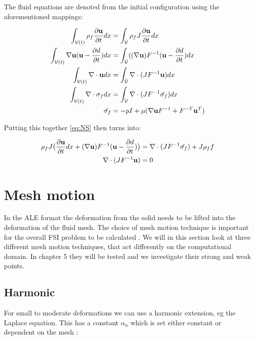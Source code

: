The fluid equations are denoted from the initial configuration using the aforementioned mappings:

\begin{align}
\int_{\mathcal{V}(t)} \rho_f \frac{\partial \bold{u}}{\partial t} dx & = \int_{\hat{\mathcal{V}}}  \rho_f J \frac{\partial \bold{u}}{\partial t} dx \\
\int_{\mathcal{V}(t)} \nabla \bold{u} (\bold{u}-\frac{\partial d}{\partial t}) dx  &= \int_{\hat{\mathcal{V}}} ((\nabla \bold{u})F^{-1}(\bold{u}-\frac{\partial d}{\partial t}) dx  \\
\int_{\mathcal{V}(t)} \nabla \cdot \bold{u} dx  &=\int_{\hat{\mathcal{V}}}  \nabla \cdot (J F^{-1} \bold{u}  ) dx \\
\int_{\mathcal{V}(t)} \nabla \cdot \sigma_f dx &= \int_{\hat{\mathcal{V}}} \nabla \cdot( J F^{-1} \hat{\sigma_f} )     dx \\
\hat{\sigma_f} &= -pI + \mu ( \nabla \bold{u} F^{-1} + F^{-T} \bold{u}^{T}  ) 
\end{align}

Putting this together \eqref{eq:NS} then turns into:

\begin{align}
\label{eq:NS_mapped}
\rho_f J \big( \frac{\partial \bold{u}}{\partial t} dx + (\nabla \bold{u})F^{-1}(\bold{u}-\frac{\partial d}{\partial t}) \big) &= \nabla \cdot( J F^{-1} \hat{\sigma_f} ) + J \rho_f f \\
\nabla \cdot (J F^{-1} \bold{u} ) &= 0
\end{align} 

\section{Mesh motion}\label{sec:meshmotion}
In the ALE format the deformation from the solid needs to be lifted into the deformation of the fluid mesh. The choice of mesh motion technique is important for the overall FSI problem to be calculated \cite{Wick2011a}. We will in this section look at three different mesh motion techniques, that act differently on the computational domain. In chapter 5 they will be tested and we investigate their strong and weak points.

\subsection{Harmonic}
For small to moderate deformations we can use a harmonic extension, eg the Laplace equation. This has a constant $\alpha_u$ which is set either constant or dependent on the mesh : 

